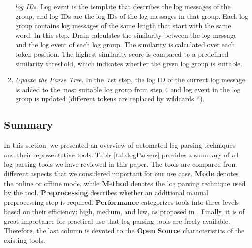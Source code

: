 \begin{enumerate}
        \textit{log IDs}. Log event is the template that describes the log messages of the group, and log IDs are the log IDs of the log messages in that group. Each log group contains log messages of the same length that start with the same word. In this step, Drain calculates the similarity between the log message and the log event of each log group. The similarity is calculated over each token position. The highest similarity score is compared to a predefined similarity threshold, which indicates whether the given log group is suitable.
        \item \textit{Update the Parse Tree}. In the last step, the log ID of the current log message is added to the most suitable log group from step $4$ and log event in the log group is updated (different tokens are replaced by wildcards *).
    \end{enumerate}

    \subsection{Summary} \label{parser_summary}
    In this section, we presented an overview of automated log parsing techniques and their representative tools. Table \ref{tab:logParsers} provides a summary of all log parsing tools we have reviewed in this paper. The tools are compared from different aspects that we considered important for our use case. \textbf{Mode} denotes the online or offline mode, while \textbf{Method} denotes the log parsing technique used by the tool. \textbf{Preprocessing} describes whether an additional manual preprocessing step is required. \textbf{Performance} categorizes tools into three levels based on their efficiency: high, medium, and low, as proposed in \cite{zhlhxzl2018}. Finally, it is of great importance for practical use that log parsing tools are freely available. Therefore, the last column is devoted to the \textbf{Open Source} characteristics of the existing tools.
    
    \begin{table}[t]
    \centering
    \caption{Summary of automated log parsing tools}
    \label{tab:logParsers}
    \end{table} 
    
